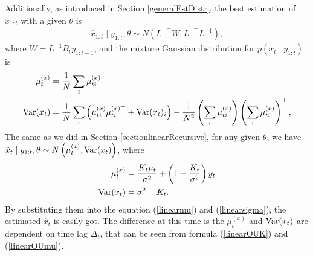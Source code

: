 Additionally, as introduced in Section \ref{generalEstDistr}, the best estimation of $x_{1:t}$ with a given $\theta$ is 
\begin{align*}
\hat{x}_{1:t} \mid y_{1:t},\theta \sim N\left(L^{-\top}W,L^{-\top}L^{-1}\right),
\end{align*}
where $W = L^{-1}B_{t}y_{1:t-1}$, and the mixture Gaussian distribution for $p(x_t \mid y_{1:t})$ is 
\begin{align}
\mu_t^{(x)} &= \frac{1}{N} \sum_i \mu_{ti}^{(x)}  \\
\mathrm{Var}(x_t) &= \frac{1}{N} \sum_i \left( \mu_{ti}^{(x)}  \mu_{ti}^{(x)\top} +\mathrm{Var}(x_t)_i\right) -\frac{1}{N^2} \left(  \sum_i  \mu_{ti}^{(x)} \right) \left( \sum_i \mu_{ti}^{(x)} \right) ^\top,
\end{align}
The same as we did in Section \ref{sectionlinearRecursive}, for any given $\theta$, we have $\hat{x}_{t}\mid y_{1:t},\theta \sim N\left( \mu_{t}^{(x)},\mathrm{Var}(x_t) \right)$, where
\begin{align*}
\mu_{t}^{(x)} &  =  \frac{K_{t}\bar{\mu}_{t}}{\sigma^2}+\left(1-\frac{K_{t}}{\sigma^2}\right)y_{t} \\
\mathrm{Var}(x_t)&= \sigma^2-K_{t}.
\end{align*}
By substituting them into the equation (\ref{linearmu}) and (\ref{linearsigma}), the estimated $\hat{x}_t$ is easily got. The difference at this time is the $\mu_{t}^{(x)}$ and $\mathrm{Var}(x_t)$ are dependent on time lag $\Delta_t$, that can be seen from formula (\ref{linearOUK}) and (\ref{linearOUmu}). 


